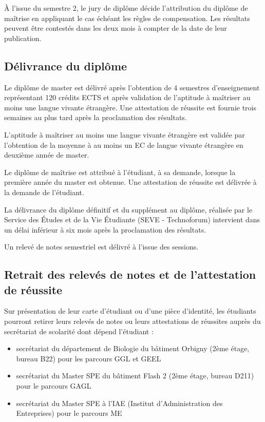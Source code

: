 \documentclass[a4paper,11pt]{article}
\begin{document}
À l'issue du semestre 2, le jury de diplôme décide l'attribution du diplôme de maîtrise en appliquant le cas échéant les règles de compensation.
Les résultats peuvent être contestés dans les deux mois à compter de la date de leur publication.


\subsection{Délivrance du diplôme}
Le diplôme de master est délivré après l'obtention de 4 semestres d'enseignement représentant 120 crédits ECTS et après validation de l'aptitude à maîtriser au moins une langue vivante étrangère. Une attestation de réussite est fournie trois semaines au plus tard après la proclamation des résultats.

L'aptitude à maîtriser au moins une langue vivante étrangère est validée par l'obtention de la moyenne à au moins un EC de langue vivante étrangère en deuxième année de master.

Le diplôme de maîtrise est attribué à l'étudiant, à sa demande, lorsque la première année du master est obtenue. Une attestation de réussite est délivrée à la demande de l'étudiant.

La délivrance du diplôme définitif et du supplément au diplôme, réalisée par le Service des Études et de la Vie Étudiante (SEVE - Technoforum) intervient dans un délai inférieur à six mois après la proclamation des résultats.

Un relevé de notes semestriel est délivré à l'issue des sessions.



\subsection{Retrait des relevés de notes et de l'attestation de réussite}
Sur présentation de leur carte d'étudiant ou d'une pièce d'identité, les étudiants pourront retirer leurs relevés de notes ou leurs attestations de réussites auprès du secrétariat de scolarité dont dépend l'étudiant : 
\begin{itemize}
\item secrétariat du département de Biologie du bâtiment Orbigny (2ème étage, bureau B22) pour les parcours GGL et GEEL
\item secrétariat du Master SPE du bâtiment Flash 2 (2ème étage, bureau D211) pour le parcours GAGL
\item secrétariat du Master SPE à l'IAE (Institut d'Administration des Entreprises) pour le parcours ME
\end{itemize}
\end{document}

